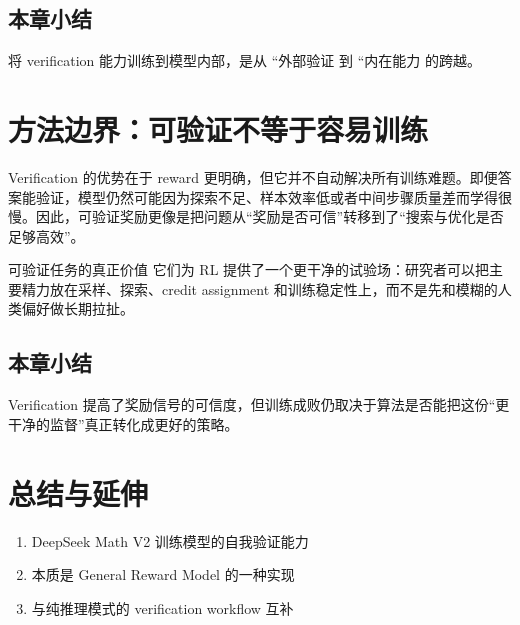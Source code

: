 \documentclass[a4paper]{article}
\begin{document}
\subsection{本章小结}
将 verification 能力训练到模型内部，是从 ``外部验证 到 ``内在能力 的跨越。

\newpage
\section{方法边界：可验证不等于容易训练}
Verification 的优势在于 reward 更明确，但它并不自动解决所有训练难题。即便答案能验证，模型仍然可能因为探索不足、样本效率低或者中间步骤质量差而学得很慢。因此，可验证奖励更像是把问题从“奖励是否可信”转移到了“搜索与优化是否足够高效”。

\begin{importantbox}{可验证任务的真正价值}
它们为 RL 提供了一个更干净的试验场：研究者可以把主要精力放在采样、探索、credit assignment 和训练稳定性上，而不是先和模糊的人类偏好做长期拉扯。
\end{importantbox}

\subsection{本章小结}
Verification 提高了奖励信号的可信度，但训练成败仍取决于算法是否能把这份“更干净的监督”真正转化成更好的策略。

\newpage
\section{总结与延伸}
\begin{enumerate}
  \item DeepSeek Math V2 训练模型的自我验证能力
  \item 本质是 General Reward Model 的一种实现
  \item 与纯推理模式的 verification workflow 互补
\end{enumerate}
\end{document}
